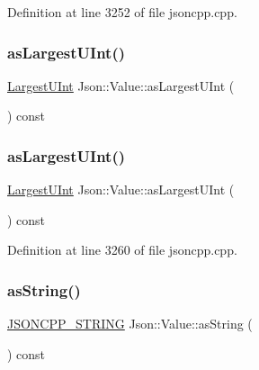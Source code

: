 Definition at line 3252 of file jsoncpp.\+cpp.

\hypertarget{class_json_1_1_value_ad03548101e0bf3d2d9eac75c64a0b8d7}{}\label{class_json_1_1_value_ad03548101e0bf3d2d9eac75c64a0b8d7} 
\subsubsection{\texorpdfstring{as\+Largest\+U\+Int()}{asLargestUInt()}\hspace{0.1cm}{\footnotesize\ttfamily [1/2]}}
{\footnotesize\ttfamily \hyperlink{class_json_1_1_value_a6682a3684d635e03fc06ba229fa24eec}{Largest\+U\+Int} Json\+::\+Value\+::as\+Largest\+U\+Int (\begin{DoxyParamCaption}{ }\end{DoxyParamCaption}) const}

\hypertarget{class_json_1_1_value_ad03548101e0bf3d2d9eac75c64a0b8d7}{}\label{class_json_1_1_value_ad03548101e0bf3d2d9eac75c64a0b8d7} 
\subsubsection{\texorpdfstring{as\+Largest\+U\+Int()}{asLargestUInt()}\hspace{0.1cm}{\footnotesize\ttfamily [2/2]}}
{\footnotesize\ttfamily \hyperlink{class_json_1_1_value_a6682a3684d635e03fc06ba229fa24eec}{Largest\+U\+Int} Json\+::\+Value\+::as\+Largest\+U\+Int (\begin{DoxyParamCaption}{ }\end{DoxyParamCaption}) const}



Definition at line 3260 of file jsoncpp.\+cpp.

\hypertarget{class_json_1_1_value_ae3f9b0d38f820ccdd8888aa92ea6e792}{}\label{class_json_1_1_value_ae3f9b0d38f820ccdd8888aa92ea6e792} 
\subsubsection{\texorpdfstring{as\+String()}{asString()}\hspace{0.1cm}{\footnotesize\ttfamily [1/2]}}
{\footnotesize\ttfamily \hyperlink{config_8h_a1e723f95759de062585bc4a8fd3fa4be}{J\+S\+O\+N\+C\+P\+P\+\_\+\+S\+T\+R\+I\+NG} Json\+::\+Value\+::as\+String (\begin{DoxyParamCaption}{ }\end{DoxyParamCaption}) const}



